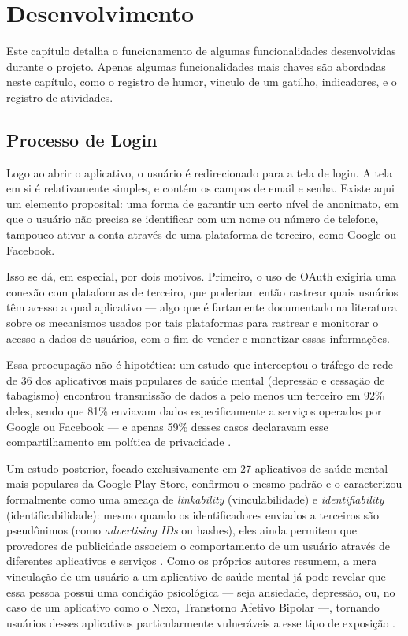 \chapter{Desenvolvimento}

Este capítulo detalha o funcionamento de algumas funcionalidades
desenvolvidas durante o projeto. Apenas algumas funcionalidades mais
chaves são abordadas neste capítulo, como o registro de humor, vinculo
de um gatilho, indicadores, e o registro de atividades.

\section{Processo de Login}

Logo ao abrir o aplicativo, o usuário é redirecionado para a tela de
login. A tela em si é relativamente simples, e contém os campos de
email e senha. Existe aqui um elemento proposital: uma forma de
garantir um certo nível de anonimato, em que o usuário não precisa se
identificar com um nome ou número de telefone, tampouco ativar a conta
através de uma plataforma de terceiro, como Google ou Facebook.

Isso se dá, em especial, por dois motivos. Primeiro, o uso de OAuth
exigiria uma conexão com plataformas de terceiro, que poderiam então
rastrear quais usuários têm acesso a qual aplicativo — algo que é
fartamente documentado na literatura sobre os mecanismos usados por
tais plataformas para rastrear e monitorar o acesso a dados de
usuários, com o fim de vender e monetizar essas informações.

Essa preocupação não é hipotética: um estudo que interceptou o tráfego de rede de
36 dos aplicativos mais populares de saúde mental (depressão e cessação de
tabagismo) encontrou transmissão de dados a pelo menos um terceiro em 92\% deles,
sendo que 81\% enviavam dados especificamente a serviços operados por Google ou
Facebook — e apenas 59\% desses casos declaravam esse compartilhamento em política
de privacidade \cite{Huckvale2019}.

Um estudo posterior, focado exclusivamente em 27 aplicativos de saúde
mental mais populares da Google Play Store, confirmou o mesmo padrão e
o caracterizou formalmente como uma ameaça de \textit{linkability}
(vinculabilidade) e \textit{identifiability} (identificabilidade): mesmo quando os
identificadores enviados a terceiros são pseudônimos (como \textit{advertising IDs}
ou hashes), eles ainda permitem que provedores de publicidade associem o
comportamento de um usuário através de diferentes aplicativos e serviços
\cite{Iwaya:22}. Como os próprios autores resumem, a mera vinculação de um
usuário a um aplicativo de saúde mental já pode revelar que essa pessoa possui
uma condição psicológica — seja ansiedade, depressão, ou, no caso de um
aplicativo como o Nexo, Transtorno Afetivo Bipolar —, tornando usuários desses
aplicativos particularmente vulneráveis a esse tipo de exposição
\cite{Iwaya:22}.

